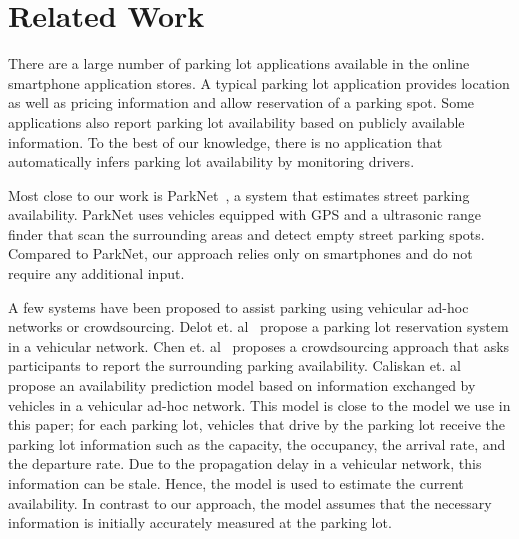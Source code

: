 \section{Related Work}
\label{sec-related}

There are a large number of parking lot applications available in the online
smartphone application stores. A typical parking lot application provides
location as well as pricing information and allow reservation of a parking spot.
Some applications also report parking lot availability based on publicly
available information. To the best of our knowledge, there is no application
that automatically infers parking lot availability by monitoring drivers.

Most close to our work is ParkNet~\cite{Mathur:2010:PDS}, a system that
estimates street parking availability. ParkNet uses vehicles equipped with GPS
and a ultrasonic range finder that scan the surrounding areas and detect
empty street parking spots. Compared to ParkNet, our approach relies only on
smartphones and do not require any additional input.

A few systems have been proposed to assist parking using vehicular ad-hoc
networks or crowdsourcing. Delot et. al~\cite{Delot:2009:CRP} propose a parking
lot reservation system in a vehicular network. Chen et. al~\cite{Chen:2012:COS}
proposes a crowdsourcing approach that asks participants to report the
surrounding parking availability. Caliskan et. al~\cite{4212497} propose an
availability prediction model based on information exchanged by vehicles in a
vehicular ad-hoc network. This model is close to the model we use in this
paper; for each parking lot, vehicles that drive by the parking lot receive the
parking lot information such as the capacity, the occupancy, the arrival rate,
and the departure rate. Due to the propagation delay in a vehicular network,
this information can be stale. Hence, the model is used to estimate the current
availability. In contrast to our approach, the model assumes that the necessary
information is initially accurately measured at the parking lot.
